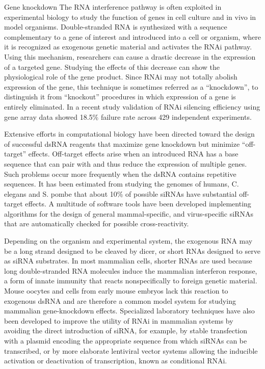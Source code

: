 Gene knockdown
The RNA interference pathway is often exploited in experimental biology to study the function of genes in cell culture and in vivo in model organisms. Double-stranded RNA is synthesized with a sequence complementary to a gene of interest and introduced into a cell or organism, where it is recognized as exogenous genetic material and activates the RNAi pathway. Using this mechanism, researchers can cause a drastic decrease in the expression of a targeted gene. Studying the effects of this decrease can show the physiological role of the gene product. Since RNAi may not totally abolish expression of the gene, this technique is sometimes referred as a ``knockdown'', to distinguish it from ``knockout'' procedures in which expression of a gene is entirely eliminated. In a recent study validation of RNAi silencing efficiency using gene array data showed 18.5\% failure rate across 429 independent experiments.

Extensive efforts in computational biology have been directed toward the design of successful dsRNA reagents that maximize gene knockdown but minimize ``off-target'' effects. Off-target effects arise when an introduced RNA has a base sequence that can pair with and thus reduce the expression of multiple genes. Such problems occur more frequently when the dsRNA contains repetitive sequences. It has been estimated from studying the genomes of humans, C. elegans and S. pombe that about 10\% of possible siRNAs have substantial off-target effects. A multitude of software tools have been developed implementing algorithms for the design of general mammal-specific, and virus-specific siRNAs that are automatically checked for possible cross-reactivity.

Depending on the organism and experimental system, the exogenous RNA may be a long strand designed to be cleaved by dicer, or short RNAs designed to serve as siRNA substrates. In most mammalian cells, shorter RNAs are used because long double-stranded RNA molecules induce the mammalian interferon response, a form of innate immunity that reacts nonspecifically to foreign genetic material. Mouse oocytes and cells from early mouse embryos lack this reaction to exogenous dsRNA and are therefore a common model system for studying mammalian gene-knockdown effects. Specialized laboratory techniques have also been developed to improve the utility of RNAi in mammalian systems by avoiding the direct introduction of siRNA, for example, by stable transfection with a plasmid encoding the appropriate sequence from which siRNAs can be transcribed, or by more elaborate lentiviral vector systems allowing the inducible activation or deactivation of transcription, known as conditional RNAi.


